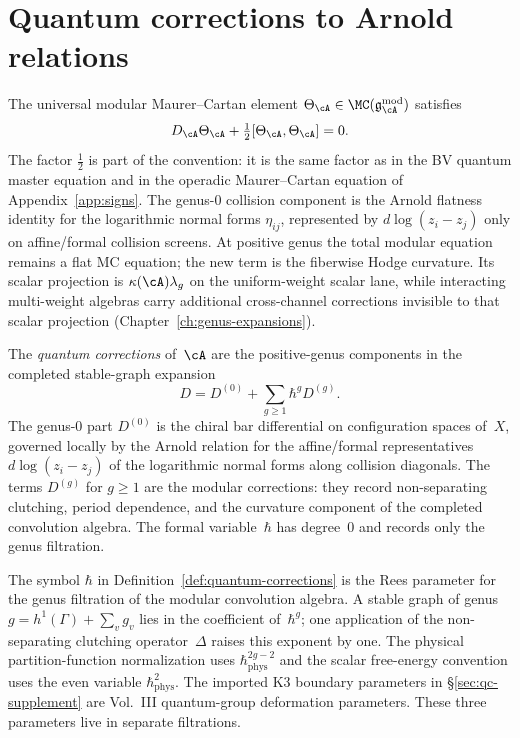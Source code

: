 \chapter{Quantum corrections to Arnold relations}
\label{ch:quantum-corrections}

The universal modular Maurer--Cartan element
$\Theta_\cA \in \MC(\mathfrak g^{\mathrm{mod}}_\cA)$ satisfies
\[
D_\cA\Theta_\cA
  + \tfrac{1}{2}[\Theta_\cA,\Theta_\cA]=0 .
\]
The factor $\tfrac{1}{2}$ is part of the convention: it is the same
factor as in the BV quantum master equation and in the operadic
Maurer--Cartan equation of Appendix~\ref{app:signs}.  The
genus-$0$ collision component is the Arnold flatness identity for the
logarithmic normal forms \(\eta_{ij}\), represented by
\(d\log(z_i-z_j)\) only on affine/formal collision screens.  At
positive genus the total modular equation remains a flat MC equation;
the new term is the
fiberwise Hodge curvature.  Its scalar projection is
$\kappa(\cA)\lambda_g$ on the uniform-weight scalar lane, while
interacting multi-weight algebras carry additional cross-channel
corrections invisible to that scalar projection
(Chapter~\ref{ch:genus-expansions}).

\begin{definition}\label{def:quantum-corrections}
The \emph{quantum corrections} of~$\cA$ are the positive-genus
components in the completed stable-graph expansion
\[
 D = D^{(0)}+\sum_{g\geq 1}\hbar^g D^{(g)} .
\]
The genus-$0$ part \(D^{(0)}\) is the chiral bar differential on
configuration spaces of~\(X\), governed locally by the Arnold relation
for the affine/formal representatives \(d\log(z_i-z_j)\) of the
logarithmic normal forms along collision diagonals.  The terms \(D^{(g)}\) for
$g\geq 1$ are the modular corrections: they record non-separating
clutching, period dependence, and the curvature component of the
completed convolution algebra.  The formal variable~$\hbar$ has
degree~$0$ and records only the genus filtration.
\end{definition}

\begin{remark}
\label{rem:qc-hbar-genus-filtration}
The symbol $\hbar$ in Definition~\ref{def:quantum-corrections} is the
Rees parameter for the genus filtration of the modular convolution
algebra.  A stable graph of genus
$g=h^1(\Gamma)+\sum_{v}g_v$ lies in the coefficient of~$\hbar^g$;
one application of the non-separating clutching operator~$\Delta$
raises this exponent by one.  The physical partition-function
normalization uses $\hbar_{\mathrm{phys}}^{2g-2}$ and the scalar
free-energy convention uses the even variable
$\hbar_{\mathrm{phys}}^2$.  The imported K3 boundary parameters in
\S\ref{sec:qc-supplement} are Vol.~III quantum-group deformation
parameters.  These three parameters live in separate filtrations.
\end{remark}

